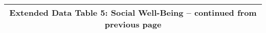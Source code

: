 \begin{longtable}{llcccccccccc}
\multicolumn{12}{c}{{\bfseries Extended Data Table 5: Social Well-Being -- continued from previous page}} \\ \hline                                                                                                                                                                                                                                                                                                                                                                                                                                                                                                                                                                                                                                                                                                                                                                                               

\end{longtable}
